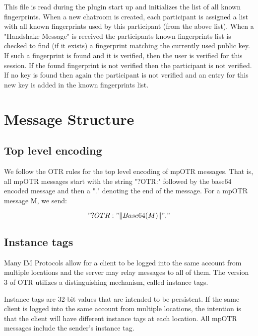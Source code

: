This file is read during the plugin start up and initializes the list of all known fingerprints.
When a new chatroom is created, each participant is assigned a list with all known fingerprints used by this participant (from the above list).
When a "Handshake Message" is received the participants known fingerprints list is checked to find (if it exists) a fingerprint matching the currently used public key.
If such a fingerprint is found and it is verified, then the user is verified for this session.
If the found fingerprint is not verified then the participant is not verified.
If no key is found then again the participant is not verified and an entry for this new key is added in the known fingerprints list. 

\section{Message Structure}

\subsection{Top level encoding}
We follow the OTR rules for the top level encoding of mpOTR messages. That is, all mpOTR messages start with the string "?OTR:" followed by the base64 encoded message and then a "." denoting the end of the message. For a mpOTR message M, we send:

\[ 
  "?OTR:" \Vert Base64(M) \Vert "."
\]

\subsection{Instance tags}
\label{subsections:instance_tags}
Many IM Protocols allow for a client to be logged into the same account from multiple locations and the server may relay messages to all of them. The version 3 of OTR utilizes a distinguishing mechanism, called instance tags.

Instance tags are 32-bit values that are intended to be persistent. If the same client is logged into the same account from multiple locations, the intention is that the client will have different instance tags at each location. All mpOTR messages include the sender's instance tag.

